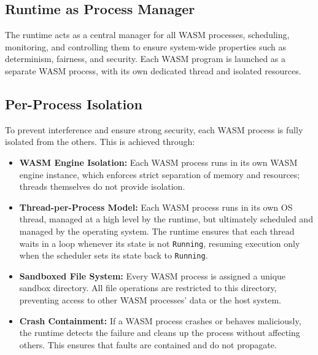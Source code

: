\documentclass[10pt,a4paper,twocolumn]{IEEEtran}
\begin{document}
\subsection*{Runtime as Process Manager}
The runtime acts as a central manager for all WASM processes, scheduling, monitoring, and controlling them to ensure system-wide properties such as determinism, fairness, and security. Each WASM program is launched as a separate WASM process, with its own dedicated thread and isolated resources.

\subsection*{Per-Process Isolation}
To prevent interference and ensure strong security, each WASM process is fully isolated from the others. This is achieved through:
\begin{itemize}
    \item \textbf{WASM Engine Isolation:} Each WASM process runs in its own WASM engine instance, which enforces strict separation of memory and resources; threads themselves do not provide isolation.
    \item \textbf{Thread-per-Process Model:} Each WASM process runs in its own OS thread, managed at a high level by the runtime, but ultimately scheduled and managed by the operating system. The runtime ensures that each thread waits in a loop whenever its state is not \texttt{Running}, resuming execution only when the scheduler sets its state back to \texttt{Running}.
    \item \textbf{Sandboxed File System:} Every WASM process is assigned a unique sandbox directory. All file operations are restricted to this directory, preventing access to other WASM processes' data or the host system.
    \item \textbf{Crash Containment:} If a WASM process crashes or behaves maliciously, the runtime detects the failure and cleans up the process without affecting others. This ensures that faults are contained and do not propagate.
\end{itemize}
\end{document}
